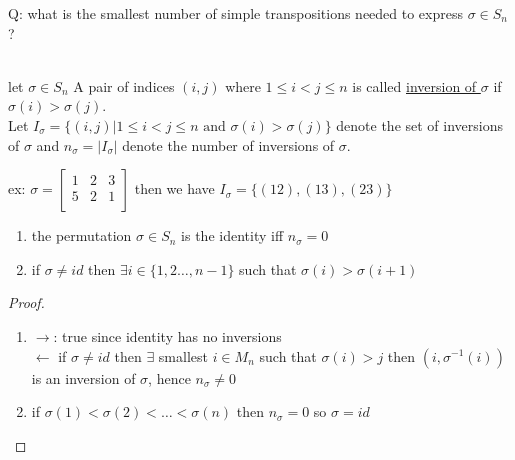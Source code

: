 \documentclass{article}
\begin{document}
Q: what is the smallest number of simple transpositions needed to express $\sigma \in S_n$?
\begin{definition}[2.9.10] \leavevmode \\     
    let $\sigma \in S_n$ A pair of indices $(i,j)$ where $1 \leq i < j \leq n$ is called \underline{inversion of $\sigma$} if $\sigma(i) > \sigma(j)$. \\ 
    Let $I_{\sigma} = \{(i,j) | 1 \leq i < j \leq n \text{ and } \sigma(i) > \sigma(j) \}$ denote the set of inversions of $\sigma$ and $n_{\sigma} = |I_{\sigma}|$ denote the number of inversions of $\sigma$.
\end{definition}
ex: $\sigma = \begin{bmatrix}
    1 & 2 & 3 \\ 
    5 & 2 & 1 \\
\end{bmatrix} $ then we have $I_\sigma = \{(12), (13), (23)\}$ 
\begin{proposition}[2.9.12] \leavevmode 
    \begin{enumerate}
        \item the permutation $\sigma \in S_n$ is the identity iff $n_{\sigma} = 0$
        \item if $\sigma \not = id$ then $\exists i \in \{1, 2 \dots, n-1\}$ such that $\sigma(i) > \sigma(i+1)$
    \end{enumerate}
    
\end{proposition}

\begin{proof}
    \begin{enumerate}
        \item $\rightarrow$: true since identity has no inversions 
        \\ 
    $\leftarrow$ if $\sigma \not = id$ then $\exists$ smallest $i \in M_n$ such that $\sigma(i) > j$ then $(i, \sigma^{-1} (i))$ is an inversion of $\sigma$, hence $n_{\sigma} \not = 0$
    \item if $\sigma(1) < \sigma(2) < \dots < \sigma(n)$ then $n_{\sigma} = 0$ so $\sigma = id$
    \end{enumerate}
\end{proof}
\end{document}
